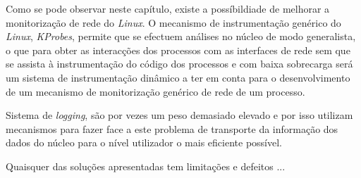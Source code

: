 Como se pode observar neste capítulo, existe a possíbildiade de melhorar a monitorização de rede do \textit{Linux}.
O mecanismo de instrumentação genérico do \textit{Linux}, \textit{KProbes}, permite que se efectuem análises no núcleo de modo generalista, o que para obter as interacções dos processos com as interfaces de rede sem que se assista à instrumentação do código dos processos e com baixa sobrecarga será um sistema de instrumentação dinâmico a ter em conta para o desenvolvimento de um mecanismo de monitorização genérico de rede de um processo.

Sistema de \textit{logging}, são por vezes um peso demasiado elevado e por isso utilizam mecanismos para fazer face a este problema de transporte da informação dos dados do núcleo para o nível utilizador o mais eficiente possível.


Quaisquer das soluções apresentadas tem limitações e defeitos ...
